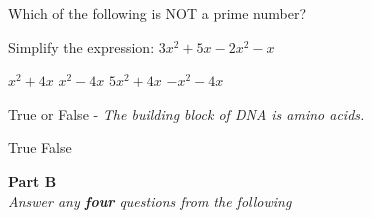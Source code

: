 \documentclass[12pt]{exam}
\begin{document}
\pointsinrightmargin 
\bracketedpoints  
\begin{questions}
\question[3] Which of the following is NOT a prime number? 
  
    \begin{oneparchoices}
    \end{oneparchoices}

\question[5] Simplify the expression: $3x^2 + 5x - 2x^2 - x$   
  \begin{oneparchoices}
    \CorrectChoice $x^2 + 4x$  
    \choice $x^2 - 4x$
    \choice $5x^2 + 4x$
    \choice $-x^2 - 4x$
  \end{oneparchoices} 

  \question[3] True or False - \textit{The building block of DNA is amino acids.} 
  \begin{oneparchoices}
    \choice True
    \CorrectChoice False  
  \end{oneparchoices}
\end{questions}
\xdef\lastquestionnumber{\arabic{question}} %
\begin{center} \textbf{Part B} \\
\textit{Answer any \textbf{four} questions from the following} \end{center}
\end{document}
